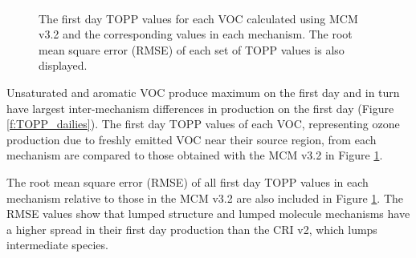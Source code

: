 \begin{figure}
    \centering
    \includegraphics[width=\textwidth]{img/first_day_values}
    \vspace{1mm}
    \caption{The first day TOPP values for each VOC calculated using MCM v3.2 and the corresponding values in each mechanism. The root mean square error (RMSE) of each set of TOPP values is also displayed.}
    \vspace{-4mm}
    \label{f:first_day}
\end{figure}

Unsaturated and aromatic VOC produce maximum  on the first day and in turn have largest inter-mechanism differences in  production on the first day (Figure \ref{f:TOPP_dailies}).
The first day TOPP values of each VOC, representing ozone production due to freshly emitted VOC near their source region, from each mechanism are compared to those obtained with the MCM v3.{2} in Figure \ref{f:first_day}.

The root mean square error (RMSE) of all first day TOPP values in each mechanism relative to those in the MCM v3.2 are also included in Figure \ref{f:first_day}.  
The RMSE values show that lumped structure and lumped molecule mechanisms have a higher spread in their first day  production than the CRI v2, which lumps intermediate species.

